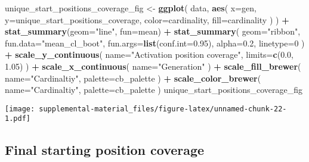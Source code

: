 \documentclass[]{book}
\newenvironment{Shaded}{\begin{snugshade}}{\end{snugshade}}
\newcommand{\DataTypeTok}[1]{\textcolor[rgb]{0.13,0.29,0.53}{#1}}
\newcommand{\DecValTok}[1]{\textcolor[rgb]{0.00,0.00,0.81}{#1}}
\newcommand{\FloatTok}[1]{\textcolor[rgb]{0.00,0.00,0.81}{#1}}
\newcommand{\KeywordTok}[1]{\textcolor[rgb]{0.13,0.29,0.53}{\textbf{#1}}}
\newcommand{\NormalTok}[1]{#1}
\newcommand{\OperatorTok}[1]{\textcolor[rgb]{0.81,0.36,0.00}{\textbf{#1}}}
\newcommand{\StringTok}[1]{\textcolor[rgb]{0.31,0.60,0.02}{#1}}
\begin{document}
\begin{Shaded}
\begin{Highlighting}[]
\NormalTok{unique_start_positions_coverage_fig <-}\StringTok{ }\KeywordTok{ggplot}\NormalTok{(}
\NormalTok{    data,}
    \KeywordTok{aes}\NormalTok{(}
      \DataTypeTok{x=}\NormalTok{gen,}
      \DataTypeTok{y=}\NormalTok{unique_start_positions_coverage,}
      \DataTypeTok{color=}\NormalTok{cardinality,}
      \DataTypeTok{fill=}\NormalTok{cardinality}
\NormalTok{    )}
\NormalTok{  ) }\OperatorTok{+}
\StringTok{  }\KeywordTok{stat_summary}\NormalTok{(}\DataTypeTok{geom=}\StringTok{"line"}\NormalTok{, }\DataTypeTok{fun=}\NormalTok{mean) }\OperatorTok{+}
\StringTok{  }\KeywordTok{stat_summary}\NormalTok{(}
    \DataTypeTok{geom=}\StringTok{"ribbon"}\NormalTok{,}
    \DataTypeTok{fun.data=}\StringTok{"mean_cl_boot"}\NormalTok{,}
    \DataTypeTok{fun.args=}\KeywordTok{list}\NormalTok{(}\DataTypeTok{conf.int=}\FloatTok{0.95}\NormalTok{),}
    \DataTypeTok{alpha=}\FloatTok{0.2}\NormalTok{,}
    \DataTypeTok{linetype=}\DecValTok{0}
\NormalTok{  ) }\OperatorTok{+}
\StringTok{  }\KeywordTok{scale_y_continuous}\NormalTok{(}
    \DataTypeTok{name=}\StringTok{"Activation position coverage"}\NormalTok{,}
    \DataTypeTok{limits=}\KeywordTok{c}\NormalTok{(}\FloatTok{0.0}\NormalTok{, }\FloatTok{1.05}\NormalTok{)}
\NormalTok{  ) }\OperatorTok{+}
\StringTok{  }\KeywordTok{scale_x_continuous}\NormalTok{(}
    \DataTypeTok{name=}\StringTok{"Generation"}
\NormalTok{  ) }\OperatorTok{+}
\StringTok{  }\KeywordTok{scale_fill_brewer}\NormalTok{(}
    \DataTypeTok{name=}\StringTok{"Cardinaltiy"}\NormalTok{,}
    \DataTypeTok{palette=}\NormalTok{cb_palette}
\NormalTok{  ) }\OperatorTok{+}
\StringTok{  }\KeywordTok{scale_color_brewer}\NormalTok{(}
    \DataTypeTok{name=}\StringTok{"Cardinaltiy"}\NormalTok{,}
    \DataTypeTok{palette=}\NormalTok{cb_palette}
\NormalTok{  )}
\NormalTok{unique_start_positions_coverage_fig}
\end{Highlighting}
\end{Shaded}

\texttt{[image: supplemental-material\_files/figure-latex/unnamed-chunk-22-1.pdf]}

\hypertarget{final-starting-position-coverage-1}{%
\subsection{Final starting position coverage}\label{final-starting-position-coverage-1}}
\end{document}
